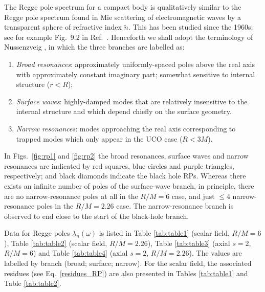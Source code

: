 \documentclass[aps,prd,longbibliography,reprint,twocolumn,amsmath,amssymb,amsfonts,showpacs,footnote,superscriptaddress]{revtex4-1}%
\begin{document}
The Regge pole spectrum for a compact body is qualitatively similar to the Regge pole spectrum found in Mie scattering of electromagnetic waves by a transparent sphere of refractive index $\tilde{n}$. This has been studied since the 1960s; see for example Fig.~9.2 in Ref.~\cite{Nussenzveig:2006}. %
Henceforth we shall adopt the terminology of Nussenzveig \cite{Nussenzveig:2006}, in which the three branches are labelled as:
\begin{enumerate}
 \item \emph{Broad resonances}: approximately uniformly-spaced poles above the real axis with approximately constant imaginary part; somewhat sensitive to internal structure ($r < R$);
 \item \emph{Surface waves}: highly-damped modes that are relatively insensitive to the internal structure and which depend chiefly on the surface geometry.
 \item \emph{Narrow resonances}: modes approaching the real axis corresponding to trapped modes which only appear in the UCO case ($R < 3M$).
\end{enumerate}
In Figs.~\ref{fig:rp1} and \ref{fig:rp2} the broad resonances, surface waves and narrow resonances are indicated by red squares, blue circles and purple triangles, respectively; and black diamonds indicate the black hole RPs. Whereas there exists an infinite number of poles of the surface-wave branch, in principle, there are no narrow-resonance poles at all in the $R/M = 6$ case, and just $\le 4$ narrow-resonance poles in the $R/M = 2.26$ case. The narrow-resonance branch is observed to end close to the start of the black-hole branch.

Data for Regge poles $\lambda_n(\omega)$ is listed in Table \ref{tab:table1} (scalar field, $R/M=6$), Table \ref{tab:table2} (scalar field, $R/M = 2.26$), Table \ref{tab:table3} (axial $s=2$, $R/M = 6$) and Table \ref{tab:table4} (axial $s=2$, $R/M = 2.26$). The values are labelled by branch (broad; surface; narrow). For the scalar field, the associated residues (see Eq.~\eqref{residues_RP}) are also presented in Tables \ref{tab:table1} and Table \ref{tab:table2}.
\end{document}
